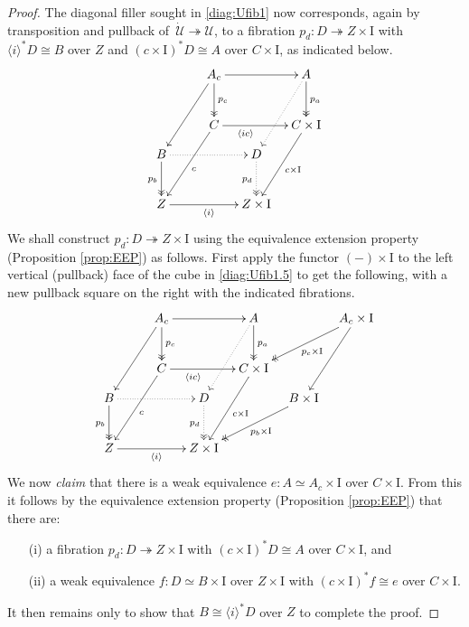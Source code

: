\documentclass[11pt,reqno]{amsart}
\newcommand{\fib}{\ensuremath{\twoheadrightarrow}}
\newcommand{\gph}[1]{\ensuremath{\langle #1 \rangle}}
\newcommand{\I}{\ensuremath{\mathrm{I}}}
\newcommand{\U}{\ensuremath{\mathcal{U}}}
\newcommand{\UU}{\ensuremath{\,\dot{\mathcal{U}}}}
\theoremstyle{remark}
\theoremstyle{definition}
\begin{document}
\begin{proof}
The diagonal filler sought in \eqref{diag:Ufib1} now corresponds, again by transposition and pullback of $\UU\fib\U$, to a fibration $p_d : D\fib Z\times \I$ with $\langle i\rangle^*D \cong B$ over $Z$ and $(c\times \I)^*D \cong A$ over $C\times \I$, as indicated below.
\begin{equation}\label{diag:Ufib1.5}
\xymatrix@=1em{
&& \ar[llddd] A_c \ar@{->>}[dd]^{p_c} \ar[rr]  &&  \ar@{..>}[lddd] A \ar@{->>}[dd]^{p_a} \\
&& && \\
&& \ar[llddd]^c C \ar[rr]_<<<<<<<{\gph{ic}}  &&  \ar[lddd]^{c\times\I} C\times\I \\
B \ar@{->>}[dd]_{p_b} \ar@{..>}[rrr] &&& D \ar@{..>>}[dd]_{p_d} & \\
&&&& \\
Z \ar[rrr]_{\gph{i}} &&& Z\times\I &
}
\end{equation}
We shall construct  $p_d : D\fib Z\times \I$ using the equivalence extension property (Proposition \ref{prop:EEP}) as follows.  First apply the functor $(-)\times\I$ to the left vertical (pullback) face of the cube in \eqref{diag:Ufib1.5} to get the following, with a new pullback square on the right with the indicated fibrations.
\begin{equation}\label{diag:Ufib2}
\begin{gathered}
\xymatrix@=1em{
&& \ar[llddd] A_c \ar@{->>}[dd]^{p_c} \ar[rr]  &&  \ar@{..>}[lddd] A \ar@{->>}[dd]^{p_a} &&  \ar@{->>}[lldd]^{p_c\times \I} A_c\times\I \ar[lddd]  \\
&& && &&\\
&& \ar[llddd]^c C  \ar[rr]_<<<<<<<{\gph{ic}}  &&  \ar[lddd]^{c\times\I} C\times\I && \\
B \ar@{->>}[dd]_{p_b} \ar@{..>}[rrr] &&& D \ar@{..>>}[dd]_{p_d} && \ar@{->>}[lldd]^{p_b\times\I} B\times\I &\\
&&&& &&\\
Z \ar[rrr]_{\gph{i}} &&& Z\times\I &&&
}
\end{gathered}
\end{equation}
We now \emph{claim} that  there is a weak equivalence $e:A \simeq A_c \times \I$ over $C\times \I$. From this it  follows by the equivalence extension property (Proposition \ref{prop:EEP}) that there are:
\begin{enumerate}
\item[(i)] a fibration $p_d : D\fib Z\times \I$ with $(c\times\I)^*D \cong A$ over $C\times\I$, and 
\item[(ii)] a weak equivalence $f:D\simeq B\times\I$ over $Z\times \I$ with $(c\times\I)^*f \cong e$ over $C\times\I$. 
\end{enumerate}
It then remains only to show that $B\cong \gph{i}^*D$ over $Z$ to complete the proof.


\end{proof}
\end{document}
